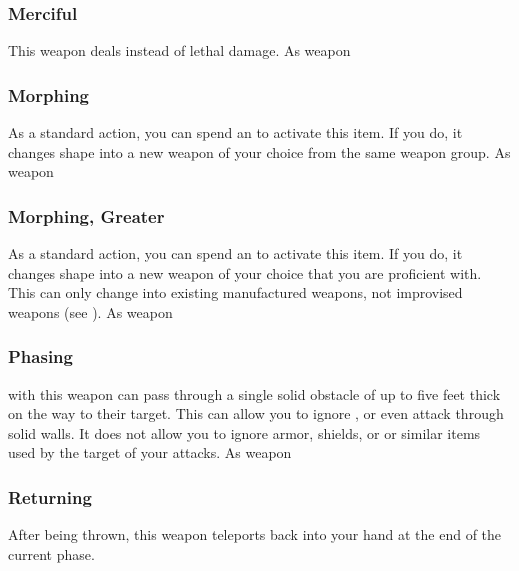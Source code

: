 \hypertarget{item:Merciful}{\subsubsection{Merciful\hfill{}}}
This weapon deals  instead of lethal damage.
 
 As weapon
\lowercase{\hypertarget{item:Morphing}{}}\label{item:Morphing}
\hypertarget{item:Morphing}{\subsubsection{Morphing\hfill{}}}
As a standard action, you can spend an  to activate this item.
If you do, it changes shape into a new weapon of your choice from the same weapon group.
 
 As weapon
\lowercase{\hypertarget{item:Morphing, Greater}{}}\label{item:Morphing, Greater}
\hypertarget{item:Morphing, Greater}{\subsubsection{Morphing, Greater\hfill{}}}
As a standard action, you can spend an  to activate this item.
If you do, it changes shape into a new weapon of your choice that you are proficient with.
This can only change into existing manufactured weapons, not improvised weapons (see ).
 
 As weapon
\lowercase{\hypertarget{item:Phasing}{}}\label{item:Phasing}
\hypertarget{item:Phasing}{\subsubsection{Phasing\hfill{}}}
 with this weapon can pass through a single solid obstacle of up to five feet thick on the way to their target.
This can allow you to ignore , or even attack through solid walls.
It does not allow you to ignore armor, shields, or or similar items used by the target of your attacks.
 
 As weapon
\lowercase{\hypertarget{item:Returning}{}}\label{item:Returning}
\hypertarget{item:Returning}{\subsubsection{Returning\hfill{}}}
After being thrown, this weapon teleports back into your hand at the end of the current phase.
